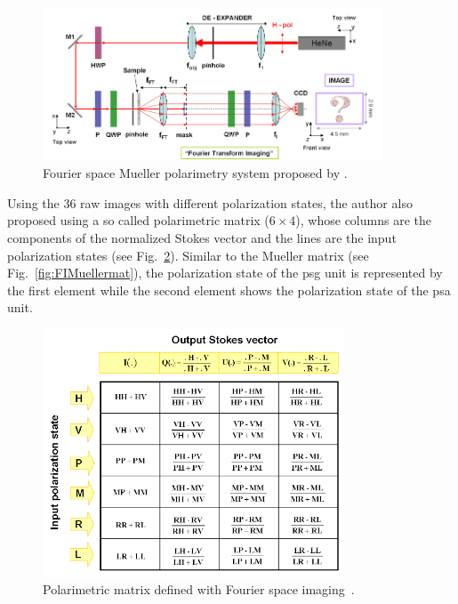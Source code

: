 \begin{figure}
\begin{center}
\includegraphics[width = 0.9\textwidth]{Chapter4/Figures/FourierTransformImaging.png}
\end{center}
\caption[Fourier space Mueller polarimetry~\cite{antonelli2011biomedical}]{ Fourier space Mueller polarimetry system proposed by \cite{antonelli2011biomedical}.}
\label{fig:FSMueller}
\end{figure}
\noindent Using the 36 raw images with different polarization states, the author also proposed using a so called polarimetric matrix ($6 \times 4$), whose columns are the components of the normalized Stokes vector and the lines are the input polarization states (see Fig.~\ref{fig:PM}).
Similar to the Mueller matrix (see Fig.~\ref{fig:FIMuellermat}), the polarization state of the \ac{psg} unit is represented by the first element while the second element shows the polarization state of the \ac{psa} unit.
	\begin{figure} [h]
	\centering 
	\includegraphics[width = 0.8\textwidth]{Chapter4/Figures/PolarimetricMatrix.png}	
	\caption[Polarimetric matrix]{Polarimetric matrix defined with Fourier space imaging~\cite{antonelli2011biomedical}. }
	\label{fig:PM}
	\end{figure}
	
